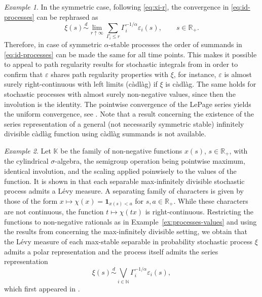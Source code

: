 \documentclass[12pt]{amsart}
\numberwithin{equation}{section}
\numberwithin{figure}{section}
\theoremstyle{plain} \newtheorem{theorem}{Theorem}[section]
\theoremstyle{plain} \newtheorem{proposition}[theorem]{Proposition}
\theoremstyle{plain} \newtheorem{lemma}[theorem]{Lemma}
\theoremstyle{plain} \newtheorem{corollary}[theorem]{Corollary}
\theoremstyle{definition} \newtheorem{definition}[theorem]{Definition}
\theoremstyle{definition} \newtheorem{notation}[theorem]{Notation}
\theoremstyle{remark} \newtheorem{remark}[theorem]{Remark}
\theoremstyle{remark} \newtheorem{example}[theorem]{Example}
\theoremstyle{definition} \newtheorem{assumption}{Assumption}
\newcommand{\bK}{\mathbb{K}}
\newcommand{\bN}{\mathbb{N}}
\newcommand{\bR}{\mathbb{R}}
\newcommand{\one}{\mathbf{1}}
\renewcommand{\epsilon}{\varepsilon}
\newcommand{\eps}{\epsilon}
\newcommand{\eqd}{\overset{d}{\sim}}
\begin{document}
\begin{example}
  In the symmetric case, following \eqref{eq:xi-r}, the convergence in
  \eqref{eq:id-processes} can be rephrased as
  \begin{displaymath}
    \xi(s)\eqd \lim_{r\uparrow\infty} \sum_{\Gamma_i\leq r} 
    \Gamma_i^{-1/\alpha}\eps_i(s),\qquad s\in\bR_+.
  \end{displaymath}
  Therefore, in case of symmetric $\alpha$-stable processes the order
  of summands in \eqref{eq:id-processes} can be made the same for all
  time points. This makes it possible to appeal to path
  regularity results for stochastic integrals from
  \cite[Th.~4]{ros89p} in order to confirm that $\eps$ shares path
  regularity properties with $\xi$, for instance, $\eps$ is almost
  surely right-continuous with left limits (c\`adl\`ag) if $\xi$ is
  c\`adl\`ag. The same holds for stochastic processes with almost
  surely non-negative values, since then the involution is the
  identity. The pointwise convergence of the LePage series yields the
  uniform convergence, see \cite{bas:ros13}. Note that a result
  concerning the existence of the series representation of a general
  (not necessarily symmetric stable) infinitely divisible c\`adl\`ag
  function using c\`adl\`ag summands is not available.
\end{example}

\begin{example}
  Let $\bK$ be the family of non-negative functions $x(s)$,
  $s\in\bR_+$, with the cylindrical $\sigma$-algebra, the semigroup
  operation being pointwise maximum, identical involution, and the
  scaling applied poinwisely to the values of the function. It is
  shown in \cite{kab:stoev12} that each separable max-infinitely
  divisible stochastic process admits a L\'evy measure. A separating
  family of characters is given by those of the form $x \mapsto
  \chi(x) = \one_{x(s)< a}$ for $s,a\in\bR_+$. While these characters
  are not continuous, the function $t\mapsto \chi(tx)$ is
  right-continuous. Restricting the functions to non-negative
  rationals as in Example~\ref{ex:processes-values} and using the
  results from \cite{kab:stoev12} concerning the max-infinitely
  divisible setting, we obtain that the L\'evy measure of each
  max-stable separable in probability stochastic process $\xi$ admits
  a polar representation and the process itself admits the series
  representation
  \begin{displaymath}
    \xi(s)\eqd \bigvee_{i\in\bN}\Gamma_i^{-1/\alpha}\eps_i(s), 
  \end{displaymath}
  which first appeared in \cite{haan84}.
\end{example}
\end{document}
